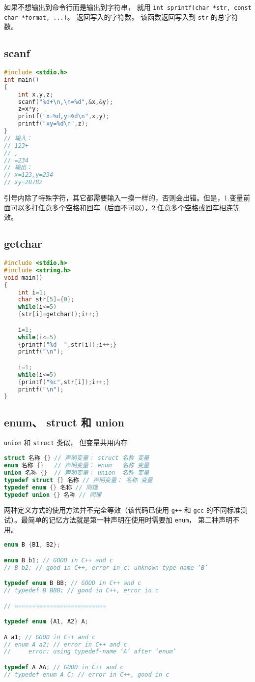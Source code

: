 如果不想输出到命令行而是输出到字符串， 就用 \verb`int sprintf(char *str, const char *format, ...)`。 返回写入的字符数。 该函数返回写入到 \verb`str` 的总字符数。

\subsection{scanf}
\begin{lstlisting}[language=cpp]
#include <stdio.h>
int main()
{
    int x,y,z;
    scanf("%d+\n,\n=%d",&x,&y);
    z=x*y;
    printf("x=%d,y=%d\n",x,y);
    printf("xy=%d\n",z);
}
// 输入：
// 123+
// ,
// =234
// 输出：
// x=123,y=234
// xy=28782
\end{lstlisting}
引号内除了特殊字符，其它都需要输入一摸一样的，否则会出错。但是，1.变量前面可以多打任意多个空格和回车（后面不可以），2.任意多个空格或回车相连等效。

\subsection{getchar}
\begin{lstlisting}[language=cpp]
#include <stdio.h>
#include <string.h>
void main()
{
    int i=1;
    char str[5]={0};
    while(i<=5)
    {str[i]=getchar();i++;}

    i=1;
    while(i<=5)
    {printf("%d  ",str[i]);i++;}
    printf("\n");

    i=1;
    while(i<=5)
    {printf("%c",str[i]);i++;}
    printf("\n");
}
\end{lstlisting}

\subsection{enum、 struct 和 union}
\verb`union` 和 \verb`struct` 类似， 但变量共用内存
\begin{lstlisting}[language=cpp]
struct 名称 {} // 声明变量： struct 名称 变量
enum 名称 {}   // 声明变量： enum   名称 变量
union 名称 {}  // 声明变量： union  名称 变量
typedef struct {} 名称 // 声明变量： 名称 变量
typedef enum {} 名称 // 同理
typedef union {} 名称 // 同理
\end{lstlisting}

两种定义方式的使用方法并不完全等效（该代码已使用 \verb`g++` 和 \verb`gcc` 的不同标准测试）。最简单的记忆方法就是第一种声明在使用时需要加 \verb`enum`， 第二种声明不用。
\begin{lstlisting}[language=cpp]
enum B {B1, B2};

enum B b1; // GOOD in C++ and c
// B b2; // good in C++, error in c: unknown type name ‘B’

typedef enum B BB; // GOOD in C++ and c
// typedef B BBB; // good in C++, error in c

// ==========================

typedef enum {A1, A2} A;

A a1; // GOOD in C++ and c
// enum A a2; // error in C++ and c
//     error: using typedef-name ‘A’ after ‘enum’

typedef A AA; // GOOD in C++ and c
// typedef enum A C; // error in C++, good in c
\end{lstlisting}

